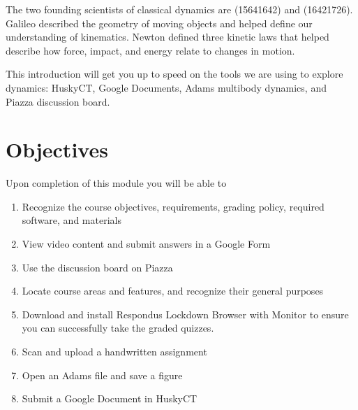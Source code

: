 \documentclass[letterpaper,10pt,english]{sphinxmanual}
\begin{document}
The two founding scientists of classical dynamics are  (1564\sphinxhyphen{}1642) and  (1642\sphinxhyphen{}1726). Galileo
described the geometry of moving objects and helped define our understanding of
kinematics. Newton defined three kinetic laws that helped describe how force,
impact, and energy relate to changes in motion.

This introduction will get you up to speed on the tools we are using to explore
dynamics: HuskyCT, Google Documents, Adams multibody dynamics, and Piazza
discussion board.


\section{Objectives}
\label{\detokenize{module_00/introduction:objectives}}
Upon completion of this module you will be able to
\begin{enumerate}
%
\item {} 
Recognize the course objectives, requirements, grading policy, required
software, and materials

\item {} 
View video content and submit answers in a Google Form

\item {} 
Use the discussion board on Piazza

\item {} 
Locate course areas and features, and recognize their general purposes

\item {} 
Download and install Respondus Lockdown Browser with Monitor to ensure you
can successfully take the graded quizzes.

\item {} 
Scan and upload a hand\sphinxhyphen{}written assignment

\item {} 
Open an Adams file and save a figure

\item {} 
Submit a Google Document in HuskyCT

\end{enumerate}
\end{document}

